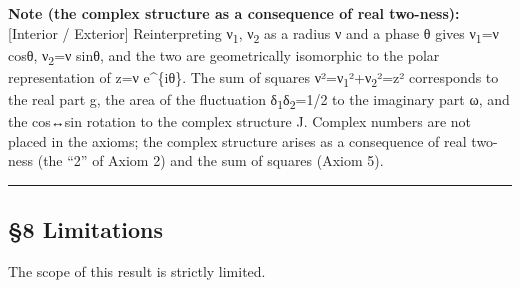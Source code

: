 \documentclass[11pt]{ltjsarticle}
\begin{document}
\textbf{Note (the complex structure as a consequence of real two-ness):}
{[}Interior / Exterior{]} Reinterpreting ν\textsubscript{1}, ν\textsubscript{2} as a radius ν and a
phase θ gives ν\textsubscript{1}=ν cosθ, ν\textsubscript{2}=ν sinθ, and the two are geometrically
isomorphic to the polar representation of z=ν e\^{}\{iθ\}. The sum of
squares ν²=ν\textsubscript{1}²+ν\textsubscript{2}²=\textbar z\textbar² corresponds to the real part g,
the area of the fluctuation δ\textsubscript{1}δ\textsubscript{2}=1/2 to the imaginary part ω, and the
cos↔sin rotation to the complex structure J. Complex numbers are not
placed in the axioms; the complex structure arises as a consequence of
real two-ness (the ``2'' of Axiom 2) and the sum of squares (Axiom 5).

\begin{center}\rule{0.5\linewidth}{0.5pt}\end{center}

\subsection{§8 Limitations}\label{limitations}

The scope of this result is strictly limited.
\end{document}

